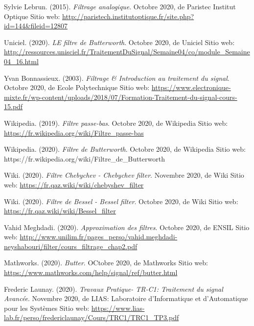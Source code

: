 \documentclass[conference,onecolumn]{IEEEtran}
\begin{document}
\begin{flushleft}
\begin{thebibliography}{100}
Sylvie Lebrun. (2015).
\textit{Filtrage analogique}. Octobre 2020, de Paristec Institut Optique Sitio web: \href{http://paristech.institutoptique.fr/site.php?id=144&fileid=12807}{http://paristech.institutoptique.fr/site.php?id=144\&fileid=12807}

Uniciel. (2020).
\textit{LE filtre de Butterworth}. Octobre 2020, de Uniciel Sitio web: \href{http://ressources.unisciel.fr/TraitementDuSignal/Semaine04/co/module\_Semaine04\_16.html}{http://ressources.unisciel.fr/TraitementDuSignal/Semaine04/co/module\_Semaine04\_16.html}

Yvan Bonnassieux. (2003).
\textit{Filtrage \& Introduction au traitement du signal}. Octobre 2020, de Ecole Polytechnique Sitio web: \href{https://www.electronique-mixte.fr/wp-content/uploads/2018/07/Formation-Traitement-du-signal-cours-15.pdf}{https://www.electronique-mixte.fr/wp-content/uploads/2018/07/Formation-Traitement-du-signal-cours-15.pdf}

Wikipedia. (2019).
\textit{Filtre passe-bas}. Octobre 2020, de Wikipedia Sitio web: \href{https://fr.wikipedia.org/wiki/Filtre\_passe-bas}{https://fr.wikipedia.org/wiki/Filtre\_passe-bas}

Wikipedia. (2020).
\textit{Filtre de Butterworth}. Octobre 2020, de Wikipedia Sitio web: https://fr.wikipedia.org/wiki/Filtre\_de\_Butterworth

Wiki. (2020).
\textit{Filtre Chebychev - Chebychev filter}. Novembre 2020, de Wiki Sitio web: \href{https://fr.qaz.wiki/wiki/chebyshev\_filter}{https://fr.qaz.wiki/wiki/chebyshev\_filter}

Wiki. (2020).
\textit{Filtre de Bessel - Bessel filter}. Octobre 2020, de Wiki Sitio web: \href{https://fr.qaz.wiki/wiki/Bessel\_filter}{https://fr.qaz.wiki/wiki/Bessel\_filter}

Vahid Meghdadi. (2020).
\textit{Approximation des filtres}. Octobre 2020, de ENSIL Sitio web: \href{http://www.unilim.fr/pages\_perso/vahid.meghdadi-neyshabouri/filter/cours\_filtrage\_chap2.pdf}{http://www.unilim.fr/pages\_perso/vahid.meghdadi-neyshabouri/filter/cours\_filtrage\_chap2.pdf}

Mathworks. (2020).
\textit{Butter}. OCtobre 2020, de Mathworks Sitio web: \href{https://www.mathworks.com/help/signal/ref/butter.html}{https://www.mathworks.com/help/signal/ref/butter.html}

Frederic Launay. (2020).
\textit{Travaux Pratique- TR-C1: Traitement du signal Avancée}. Novembre 2020, de LIAS: Laboratoire d'Informatique et d'Automatique pour les Systèmes Sitio web: \href{https://www.lias-lab.fr/perso/fredericlaunay/Cours/TRC1/TRC1\_TP3.pdf}{https://www.lias-lab.fr/perso/fredericlaunay/Cours/TRC1/TRC1\_TP3.pdf}


\end{thebibliography}
\end{flushleft}
\end{document}
